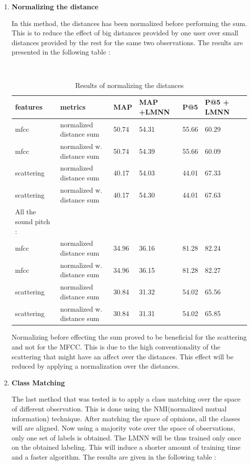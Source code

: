 \documentclass[hidelinks,12pt]{report}
\begin{document}
\begin{enumerate}
\item \textbf{Normalizing the distance}\par 
In this method, the distances has been normalized before performing the sum. This is to reduce the effect of big distances provided by one user over small distances provided by the rest for the same two observations. The results are presented in the following table :
\begin{table} [H]
\begin{center} 
\ 
 \setlength{\tabcolsep}{.16667em} 
\begin{tabular}{ | l | l | l | l | l | l | l |}
\hline
features & metrics & MAP & MAP +LMNN & P@5 & P@5 + LMNN  \\ 
\hline 
mfcc & normalized distance sum & 50.74 & 54.31 & 55.66 & 60.29  \\ 
mfcc & normalized w. distance sum &50.74 & 54.39 & 55.66 & 60.09  \\ 
scattering & normalized distance sum & 40.17 & 54.03 & 44.01 & 67.33  \\ 
scattering & normalized w. distance sum  & 40.17 & 54.30 & 44.01 & 67.63 \\
\hline All the sound pitch :
\\
\hline 
mfcc & normalized distance sum & 34.96  & 36.16 & 81.28  & 82.24 \\ 
mfcc & normalized w. distance sum & 34.96 & 36.15 & 81.28 & 82.27 \\ 
scattering & normalized distance sum & 30.84 & 31.32 & 54.02 & 65.56  \\ 
scattering & normalized w. distance sum  & 30.84  & 31.31 & 54.02  & 65.85  \\
\hline
\end{tabular} 
\end{center} 
\caption{Results of normalizing the distances} 
\label{you} 
\end{table}  
 Normalizing before effecting the sum proved to be beneficial for the scattering and not for the MFCC. This is due to the high conventionality of the scattering that might have an affect over the distances. This effect will be reduced by applying a normalization over the distances.
 \item \textbf{Class Matching} \par 
 The last method that was tested is to apply a class matching over the space of different observation. This is done using the NMI(normalized mutual information) technique. After matching the space of opinions, all the classes will are aligned. Now using a majority vote over the space of observations, only one set of labels is obtained. The LMNN will be thus trained only once on the obtained labeling. This will induce a shorter amount of training time and a faster algorithm. The results are given in the following table : 

\end{enumerate}
\end{document}
